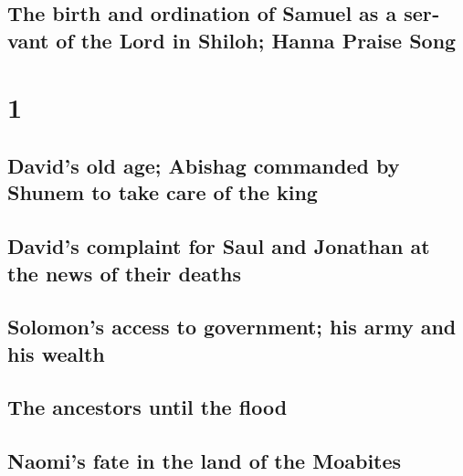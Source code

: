 \begin{paracol}{2}
\switchcolumn
\begin{otherlanguage}{english}

\hypertarget{the-birth-and-ordination-of-samuel-as-a-servant-of-the-lord-in-shiloh-hanna-praise-song}{%
\subsection{The birth and ordination of Samuel as a servant of the Lord
in Shiloh; Hanna Praise
Song}\label{the-birth-and-ordination-of-samuel-as-a-servant-of-the-lord-in-shiloh-hanna-praise-song}}

\hypertarget{section-1}{%
\section{1}\label{section-1}}

\hypertarget{davids-old-age-abishag-commanded-by-shunem-to-take-care-of-the-king}{%
\subsection{David's old age; Abishag commanded by Shunem to take care of
the
king}\label{davids-old-age-abishag-commanded-by-shunem-to-take-care-of-the-king}}

\hypertarget{davids-complaint-for-saul-and-jonathan-at-the-news-of-their-deaths}{%
\subsection{David's complaint for Saul and Jonathan at the news of their
deaths}\label{davids-complaint-for-saul-and-jonathan-at-the-news-of-their-deaths}}

\hypertarget{solomons-access-to-government-his-army-and-his-wealth}{%
\subsection{Solomon's access to government; his army and his
wealth}\label{solomons-access-to-government-his-army-and-his-wealth}}

\hypertarget{the-ancestors-until-the-flood}{%
\subsection{The ancestors until the
flood}\label{the-ancestors-until-the-flood}}

\hypertarget{naomis-fate-in-the-land-of-the-moabites}{%
\subsection{Naomi's fate in the land of the
Moabites}\label{naomis-fate-in-the-land-of-the-moabites}}


\end{otherlanguage}
\end{paracol}
